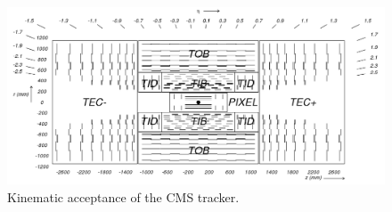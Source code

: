 \begin{figure}
\begin{center}
\includegraphics[width=.95\textwidth]{pics/tracker_diagram}
\end{center}
\caption{Kinematic acceptance of the CMS tracker.}
\label{fig:tracker_diagram}
\end{figure}

